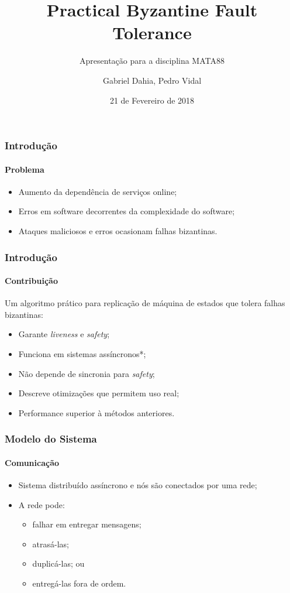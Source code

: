 \documentclass{beamer}
\title{Practical Byzantine Fault Tolerance}
\subtitle{Apresentação para a disciplina MATA88}
\author{Gabriel Dahia, Pedro Vidal}
\date{21 de Fevereiro de 2018}
\institute{Universidade Federal da Bahia}
\begin{document}
\frame{\maketitle}

\begin{frame}
  \frametitle{Introdução}
  \framesubtitle{Problema}

  \begin{itemize}
    \item
      Aumento da dependência de serviços online;

    \item
      Erros em software decorrentes da complexidade do software;

    \item
      Ataques maliciosos e erros ocasionam falhas bizantinas.
  \end{itemize}
\end{frame}

\begin{frame}
  \frametitle{Introdução}
  \framesubtitle{Contribuição}

  Um algoritmo prático para replicação de máquina de estados que tolera falhas bizantinas:
  \begin{itemize}
    \item
      Garante \textit{liveness} e \textit{safety};

    \item
      Funciona em sistemas assíncronos*;

    \item
      Não depende de sincronia para \textit{safety};

    \item
      Descreve otimizações que permitem uso real;
      
    \item
      Performance superior à métodos anteriores.
  \end{itemize}
\end{frame}

\begin{frame}
  \frametitle{Modelo do Sistema}
  \framesubtitle{Comunicação}

  \begin{itemize}
    \item
      Sistema distribuído assíncrono e nós são conectados por uma rede;

    \item
      A rede pode:
      \begin{itemize}
        \item
          falhar em entregar mensagens;

        \item
          atrasá-las;

        \item
          duplicá-las; ou

        \item
          entregá-las fora de ordem.
      \end{itemize}
  \end{itemize}

\end{frame}
\end{document}
